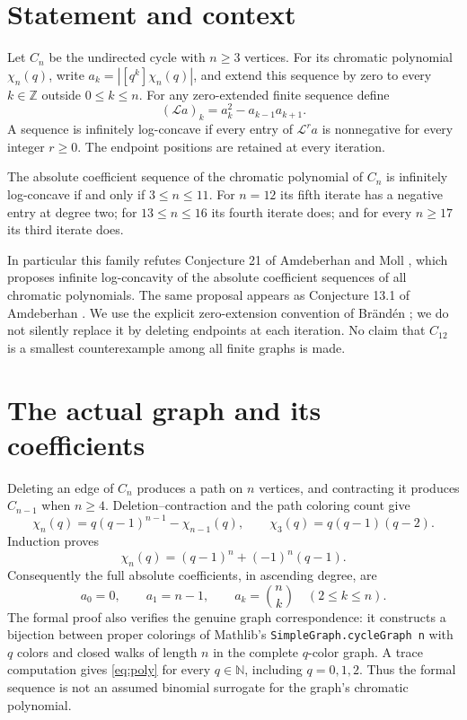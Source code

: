 \section{Statement and context}
Let $C_n$ be the undirected cycle with $n\ge3$ vertices. For its chromatic
polynomial $\chi_n(q)$, write $a_k=|[q^k]\chi_n(q)|$, and extend this
sequence by zero to every $k\in\mathbb Z$ outside $0\le k\le n$.
For any zero-extended finite sequence define
\[
 (\mathcal La)_k=a_k^2-a_{k-1}a_{k+1}.
\]
A sequence is infinitely log-concave if every entry of $\mathcal L^r a$
is nonnegative for every integer $r\ge0$. The endpoint positions are
retained at every iteration.

\begin{theorem}\label{thm:classification}
The absolute coefficient sequence of the chromatic polynomial of $C_n$
is infinitely log-concave if and only if $3\le n\le11$.
For $n=12$ its fifth iterate has a negative entry at degree two;
for $13\le n\le16$ its fourth iterate does; and for every $n\ge17$
its third iterate does.
\end{theorem}

In particular this family refutes Conjecture 21 of Amdeberhan and Moll
\cite{AM}, which proposes infinite log-concavity of the absolute coefficient
sequences of all chromatic polynomials. The same proposal appears as
Conjecture 13.1 of Amdeberhan \cite{A}. We use the explicit zero-extension
convention of Br\"and\'en \cite{B}; we do not silently replace it by
deleting endpoints at each iteration. No claim that $C_{12}$ is a smallest
counterexample among all finite graphs is made.

\section{The actual graph and its coefficients}
Deleting an edge of $C_n$ produces a path on $n$ vertices, and contracting
it produces $C_{n-1}$ when $n\ge4$. Deletion--contraction and the path
coloring count give
\[
 \chi_n(q)=q(q-1)^{n-1}-\chi_{n-1}(q),\qquad
 \chi_3(q)=q(q-1)(q-2).
\]
Induction proves
\begin{equation}\label{eq:poly}
 \chi_n(q)=(q-1)^n+(-1)^n(q-1).
\end{equation}
Consequently the full absolute coefficients, in ascending degree, are
\begin{equation}\label{eq:sequence}
 a_0=0,\qquad a_1=n-1,\qquad
 a_k=\binom nk\quad(2\le k\le n).
\end{equation}
The formal proof also verifies the genuine graph correspondence: it
constructs a bijection between proper colorings of Mathlib's
\texttt{SimpleGraph.cycleGraph n} with $q$ colors and closed walks of length
$n$ in the complete $q$-color graph. A trace computation gives
\eqref{eq:poly} for every $q\in\mathbb N$, including $q=0,1,2$.
Thus the formal sequence is not an assumed binomial surrogate for the
graph's chromatic polynomial.

